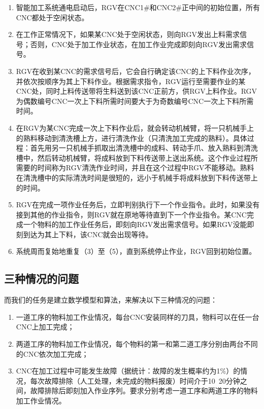 \documentclass{cumcmthesis}
\begin{document}
\begin{enumerate}[（1）]
	
\item 智能加工系统通电启动后，RGV在CNC1\#和CNC2\#正中间的初始位置，所有CNC都处于空闲状态。

\item 在工作正常情况下，如果某CNC处于空闲状态，则向RGV发出上料需求信号；否则，CNC处于加工作业状态，在加工作业完成即刻向RGV发出需求信号。

\item RGV在收到某CNC的需求信号后，它会自行确定该CNC的上下料作业次序，并依次按顺序为其上下料作业。根据需求指令，RGV运行至需要作业的某CNC处，同时上料传送带将生料送到该CNC正前方，供RGV上料作业。RGV为偶数编号CNC一次上下料所需时间要大于为奇数编号CNC一次上下料所需时间。

\item 在RGV为某CNC完成一次上下料作业后，就会转动机械臂，将一只机械手上的熟料移动到清洗槽上方，进行清洗作业（只清洗加工完成的熟料）。具体过程：首先用另一只机械手抓取出清洗槽中的成料、转动手爪、放入熟料到清洗槽中，然后转动机械臂，将成料放到下料传送带上送出系统。这个作业过程所需要的时间称为RGV清洗作业时间，并且在这个过程中RGV不能移动。熟料在清洗槽中的实际清洗时间是很短的，远小于机械手将成料放到下料传送带上的时间。

\item RGV在完成一项作业任务后，立即判别执行下一个作业指令。此时，如果没有接到其他的作业指令，则RGV就在原地等待直到下一个作业指令。某CNC完成一个物料的加工作业任务后，即刻向RGV发出需求信号。如果RGV没能即刻到达为其上下料，该CNC就会出现等待。

\item 系统周而复始地重复（3）至（5），直到系统停止作业，RGV回到初始位置。

\end{enumerate}

\subsection{三种情况的问题}

而我们的任务是建立数学模型和算法，来解决以下三种情况的问题：

\begin{enumerate}[（1）]
	
\item 一道工序的物料加工作业情况，每台CNC安装同样的刀具，物料可以在任一台CNC上加工完成；
\item 两道工序的物料加工作业情况，每个物料的第一和第二道工序分别由两台不同的CNC依次加工完成；
\item CNC在加工过程中可能发生故障（据统计：故障的发生概率约为1\%）的情况，每次故障排除（人工处理，未完成的物料报废）时间介于10~20分钟之间，故障排除后即刻加入作业序列。要求分别考虑一道工序和两道工序的物料加工作业情况。

\end{enumerate}
\end{document}
